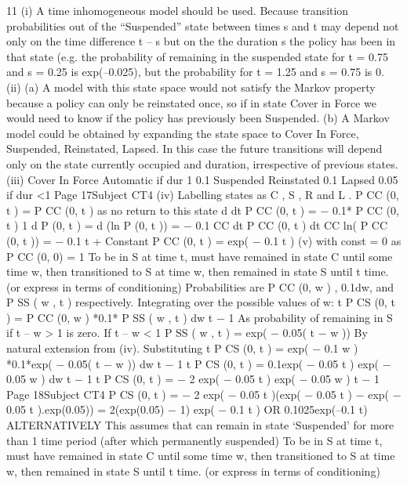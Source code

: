 11
(i)
A time inhomogeneous model should be used.
Because transition probabilities out of the “Suspended” state between
times s and t may depend not only on the time difference t – s but on the
the duration s the policy has been in that state (e.g. the probability of
remaining in the suspended state for t = 0.75 and s = 0.25 is exp(–0.025), but
the probability for t = 1.25 and s = 0.75 is 0.
(ii)
(a)
A model with this state space would not satisfy the
Markov property because a policy can only be reinstated once,
so if in state Cover in Force we would need to know if the
policy has previously been Suspended.
(b)
A Markov model could be obtained by expanding the state space
to {Cover In Force, Suspended, Reinstated, Lapsed}.
In this case the future transitions will depend only on the state
currently occupied and duration, irrespective of previous states.
(iii)
Cover In
Force
Automatic if dur 1
0.1
Suspended
Reinstated
0.1
Lapsed
0.05 if
dur <1
Page 17Subject CT4 %
(iv)
Labelling states as C , S , R and L .
P CC (0, t ) = P CC (0, t ) as no return to this state
d
dt
P CC (0, t ) = − 0.1* P CC (0, t )
1
d P (0, t ) = d (ln P (0, t )) = − 0.1
CC
dt
P CC (0, t ) dt CC
ln( P CC (0, t )) = − 0.1 t + Constant
P CC (0, t ) = exp( − 0.1 t )
(v)
with const = 0 as P CC (0, 0) = 1
To be in S at time t, must have remained in state C until some time w,
then transitioned to S at time w, then remained in state S until t time.
(or express in terms of conditioning)
Probabilities are P CC (0, w ) , 0.1dw, and P SS ( w , t ) respectively.
Integrating over the possible values of w:
t
P CS (0, t ) =
\int P CC (0, w ) *0.1* P SS ( w , t ) dw
t − 1
As probability of remaining in S if t – w > 1 is zero.
If t – w < 1
P SS ( w , t ) = exp( − 0.05( t − w ))
By natural extension from (iv).
Substituting
t
P CS (0, t ) =
\int exp( − 0.1 w ) *0.1*exp( − 0.05( t − w )) dw
t − 1
t
P CS (0, t ) = 0.1exp( − 0.05 t ) \int exp( − 0.05 w ) dw
t − 1
t
P CS (0, t ) = − 2 exp( − 0.05 t ) exp( − 0.05 w ) t − 1
Page 18Subject CT4 %
P CS (0, t ) = − 2 exp( − 0.05 t )(exp( − 0.05 t ) − exp( − 0.05 t ).exp(0.05))
= 2(exp(0.05) − 1) exp( − 0.1 t )
OR
0.1025exp(–0.1 t)
ALTERNATIVELY
This assumes that can remain in state ‘Suspended’ for more than 1 time period
(after which permanently suspended)
To be in S at time t, must have remained in state C until some time w,
then transitioned to S at time w, then remained in state S until t time.
(or express in terms of conditioning)
